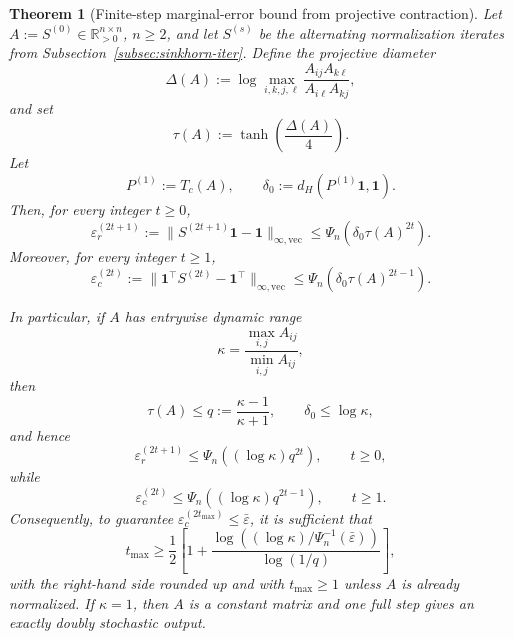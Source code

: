 \documentclass[11pt]{article}
\numberwithin{equation}{section}
\theoremstyle{plain}
\newtheorem{theorem}{Theorem}[section]
\theoremstyle{definition}
\theoremstyle{remark}
\newcommand{\R}{\mathbb{R}}
\newcommand{\ones}{\mathbf{1}}
\begin{document}
\begin{theorem}[Finite-step marginal-error bound from projective contraction]\label{thm:sinkhorn}
Let $A:=S^{(0)}\in\R_{>0}^{n\times n}$, $n\ge2$, and let $S^{(s)}$ be the alternating normalization iterates from Subsection~\ref{subsec:sinkhorn-iter}. Define the projective diameter
\begin{equation}\label{eq:projective-diameter}
\Delta(A)
:=
\log\max_{i,k,j,\ell}
\frac{A_{ij}A_{k\ell}}{A_{i\ell}A_{kj}},
\end{equation}
and set
\begin{equation}
\tau(A):=\tanh\!\left(\frac{\Delta(A)}4\right).
\end{equation}
Let
\begin{equation}
P^{(1)}:=T_c(A),
\qquad
\delta_0:=d_H(P^{(1)}\ones,\ones).
\end{equation}
Then, for every integer $t\ge0$,
\begin{equation}\label{eq:row-certificate-tau}
\varepsilon_r^{(2t+1)}
:=
\|S^{(2t+1)}\ones-\ones\|_{\infty,\mathrm{vec}}
\le
\Psi_n\!\left(\delta_0\tau(A)^{2t}\right).
\end{equation}
Moreover, for every integer $t\ge1$,
\begin{equation}\label{eq:column-certificate-tau}
\varepsilon_c^{(2t)}
:=
\|\ones^\top S^{(2t)}-\ones^\top\|_{\infty,\mathrm{vec}}
\le
\Psi_n\!\left(\delta_0\tau(A)^{2t-1}\right).
\end{equation}

In particular, if $A$ has entrywise dynamic range
\[
\kappa=\frac{\max_{i,j}A_{ij}}{\min_{i,j}A_{ij}},
\]
then
\[
\tau(A)\le q:=\frac{\kappa-1}{\kappa+1},
\qquad
\delta_0\le \log\kappa,
\]
and hence
\begin{equation}\label{eq:row-certificate-kappa}
\varepsilon_r^{(2t+1)}
\le
\Psi_n\!\left((\log\kappa)q^{2t}\right),
\qquad t\ge0,
\end{equation}
while
\begin{equation}\label{eq:column-certificate-kappa}
\varepsilon_c^{(2t)}
\le
\Psi_n\!\left((\log\kappa)q^{2t-1}\right),
\qquad t\ge1.
\end{equation}
Consequently, to guarantee $\varepsilon_c^{(2t_{\max})}\le\bar\varepsilon$, it is sufficient that
\begin{equation}\label{eq:tmax}
t_{\max}
\ge
\frac12
\left[
1+
\frac{\log\!\left((\log\kappa)/\Psi_n^{-1}(\bar\varepsilon)\right)}
{\log(1/q)}
\right],
\end{equation}
with the right-hand side rounded up and with $t_{\max}\ge1$ unless $A$ is already normalized. If $\kappa=1$, then $A$ is a constant matrix and one full step gives an exactly doubly stochastic output.
\end{theorem}
\end{document}
